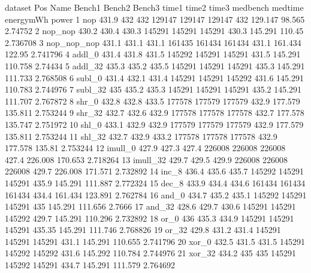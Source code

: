 \begin{filecontents}{dataset}
Pos	Name	Bench1	Bench2	Bench3	time1	time2	time3	medbench	medtime	energymWh	power
1	nop	431.9	432	432	129147	129147	129147	432	129.147	98.565	2.74752
2	nop\_nop	430.2	430.4	430.3	145291	145291	145291	430.3	145.291	110.45	2.736708
3	nop\_nop\_nop	431.1	431.1	431.1	161435	161434	161434	431.1	161.434	122.95	2.741796
4	addl\_0	431.4	431.8	431.5	145292	145291	145291	431.5	145.291	110.758	2.74434
5	addl\_32	435.3	435.2	435.5	145291	145291	145291	435.3	145.291	111.733	2.768508
6	subl\_0	431.4	432.1	431.4	145291	145291	145292	431.6	145.291	110.783	2.744976
7	subl\_32	435	435.2	435.3	145291	145291	145291	435.2	145.291	111.707	2.767872
8	shr\_0	432.8	432.8	433.5	177578	177579	177579	432.9	177.579	135.811	2.753244
9	shr\_32	432.7	432.6	432.9	177578	177578	177578	432.7	177.578	135.747	2.751972
10	shl\_0	433.1	432.9	432.9	177579	177579	177579	432.9	177.579	135.811	2.753244
11	shl\_32	432.7	432.9	433.2	177578	177578	177578	432.9	177.578	135.81	2.753244
12	imull\_0	427.9	427.3	427.4	226008	226008	226008	427.4	226.008	170.653	2.718264
13	imull\_32	429.7	429.5	429.9	226008	226008	226008	429.7	226.008	171.571	2.732892
14	inc\_8	436.4	435.6	435.7	145292	145291	145291	435.9	145.291	111.887	2.772324
15	dec\_8	433.9	434.4	434.6	161434	161434	161434	434.4	161.434	123.891	2.762784
16	and\_0	434.7	435.2	435.1	145292	145291	145291	435	145.291	111.656	2.7666
17	and\_32	428.6	429.7	430.6	145291	145291	145292	429.7	145.291	110.296	2.732892
18	or\_0	436	435.3	434.9	145291	145291	145291	435.35	145.291	111.746	2.768826
19	or\_32	429.8	431.2	431.4	145291	145291	145291	431.1	145.291	110.655	2.741796
20	xor\_0	432.5	431.5	431.5	145291	145292	145292	431.6	145.292	110.784	2.744976
21	xor\_32	434.2	435	435	145291	145292	145291	434.7	145.291	111.579	2.764692
\end{filecontents}



